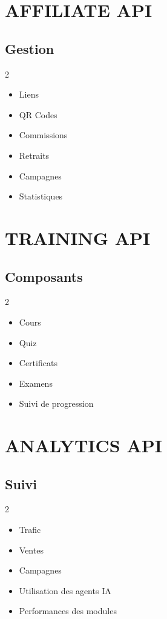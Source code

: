\documentclass[12pt,a4paper,oneside]{book}
\begin{document}
\chapter{AFFILIATE API}

\section{Gestion}
\begin{multicols}{2}
\begin{itemize}
\item Liens
\item QR Codes
\item Commissions
\item Retraits
\item Campagnes
\item Statistiques
\end{itemize}
\end{multicols}

\chapter{TRAINING API}

\section{Composants}
\begin{multicols}{2}
\begin{itemize}
\item Cours
\item Quiz
\item Certificats
\item Examens
\item Suivi de progression
\end{itemize}
\end{multicols}

\chapter{ANALYTICS API}

\section{Suivi}
\begin{multicols}{2}
\begin{itemize}
\item Trafic
\item Ventes
\item Campagnes
\item Utilisation des agents IA
\item Performances des modules
\end{itemize}
\end{multicols}
\end{document}
